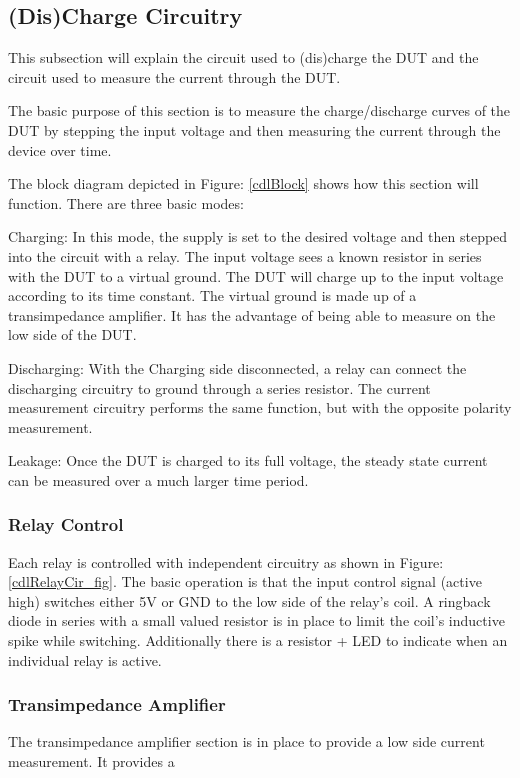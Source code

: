 \subsection {(Dis)Charge Circuitry}

This subsection will explain the circuit used to (dis)charge the DUT and the circuit used to measure the current through the DUT.

The basic purpose of this section is to measure the charge/discharge curves of the DUT by stepping the input voltage and then measuring the current through the device over time.


The block diagram depicted in Figure: \ref{cdlBlock} shows how this section will function. There are three basic modes:

Charging:
In this mode, the supply is set to the desired voltage and then stepped into the circuit with a relay. The input voltage sees a known resistor in series with the DUT to a virtual ground. The DUT will charge up to the input voltage according to its time constant. The virtual ground is made up of a transimpedance amplifier. It has the advantage of being able to measure on the low side of the DUT.

Discharging:
With the Charging side disconnected, a relay can connect the discharging circuitry to ground through a series resistor. The current measurement circuitry performs the same function, but with the opposite polarity measurement.

Leakage:
Once the DUT is charged to its full voltage, the steady state current can be measured over a much larger time period.

\subsubsection{Relay Control}

Each relay is controlled with independent circuitry as shown in Figure: \ref{cdlRelayCir_fig}. The basic operation is that the input control signal (active high) switches either 5V or GND to the low side of the relay's coil. A ringback diode in series with a small valued resistor is in place to limit the coil's inductive spike while switching. Additionally there is a resistor + LED to indicate when an individual relay is active.

\subsubsection{Transimpedance Amplifier}
The transimpedance amplifier section is in place to provide a low side current measurement. It provides a 



